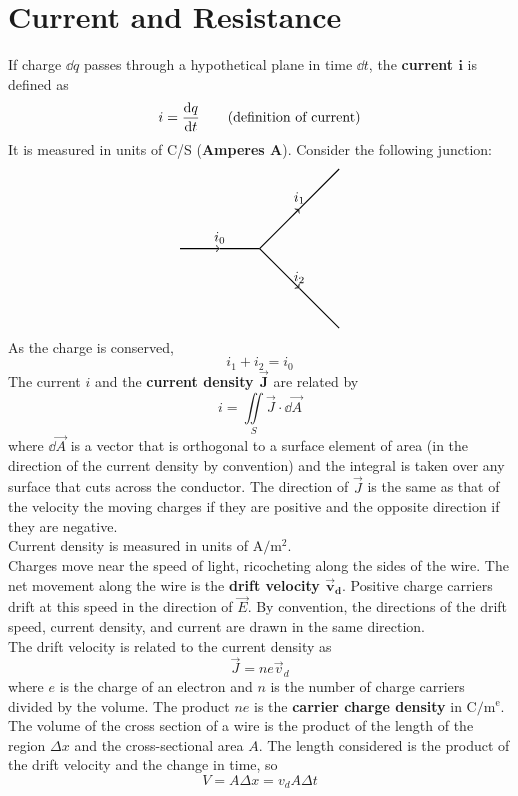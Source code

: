 \documentclass[./Electricity and Magnetism.tex]{subfiles}
\begin{document}
	\section{Current and Resistance}
		If charge \(\dd{q}\) passes through a hypothetical plane in time \(\dd{t}\), the \textbf{current \(\bm{i}\)} is defined as
			\[i = \dv{q}{t} \tag{definition of current}\]
			It is measured in units of C/S (\textbf{Amperes A}).
		Consider the following junction:
			\[\begin{tikzpicture}[scale = 2]
				\draw[thick, ->] (0, 0) -- (0.5, 0) node[above]{\(i_0\)};
				\draw[thick] (0.5, 0) -- (1, 0);
				\draw[thick, ->] (1, 0) to (1.5, 0.5) node[above]{\(i_1\)};
				\draw[thick] (1.5, 0.5) to (2, 1);
				\draw[thick, ->] (1, 0) to (1.5, -0.5) node[above]{\(i_2\)};
				\draw[thick] (1.5, -0.5) to (2, -1);
			\end{tikzpicture}\]
			As the charge is conserved,
			\[i_1 + i_2 = i_0\]
		The current \(i\) and the \textbf{current density \(\bm{\vec{J}}\)} are related by
			\[i = \iint\limits_S \vec{J} \cdot \dd{\vec{A}}\]
			where \(\dd{\vec{A}}\) is a vector that is orthogonal to a surface element of area (in the direction of the current density by convention) and the integral is taken over any surface that cuts across the conductor. The direction of \(\vec{J}\) is the same as that of the velocity the moving charges if they are positive and the opposite direction if they are negative. \\
			Current density is measured in units of \(\mathrm{A/m^2}\). \\
		Charges move near the speed of light, ricocheting along the sides of the wire. The net movement along the wire is the \textbf{drift velocity \(\bm{\vec{v}_d}\)}. Positive charge carriers drift at this speed in the direction of \(\vec{E}\). By convention, the directions of the drift speed, current density, and current are drawn in the same direction. \\
			The drift velocity is related to the current density as
			\[\vec{J} = ne\vec{v}_d\]
			where \(e\) is the charge of an electron and \(n\) is the number of charge carriers divided by the volume. The product \(ne\) is the \textbf{carrier charge density} in \(\mathrm{C/m^e}\). \\
		The volume of the cross section of a wire is the product of the length of the region \(\Delta x\) and the cross-sectional area \(A\). The length considered is the product of the drift velocity and the change in time, so
			\[
				V = A\Delta x = 
					v_dA\Delta t
			\] 
\end{document}
